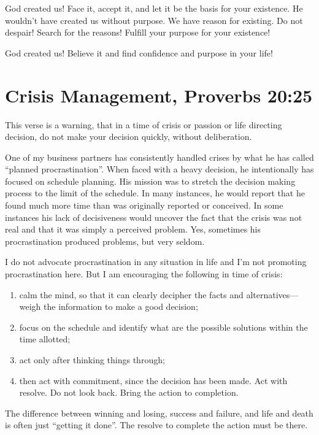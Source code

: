\documentclass[12pt]{memoir}
\begin{document}
God created us! Face it, accept it, and let it be the basis for your
existence. He wouldn't have created us without purpose. We have reason
for existing. Do not despair! Search for the reasons! Fulfill your
purpose for your existence!

God created us! Believe it and find confidence and purpose in your
life!

\section[Crisis Management]{Crisis Management, Proverbs 20:25}

This verse is a warning, that in a time of crisis or passion or life
directing decision, do not make your decision quickly, without deliberation.

One of my business partners has consistently handled crises by what
he has called ``planned procrastination''. When faced with a heavy
decision, he intentionally has focused on schedule planning. His
mission was to stretch the decision making process to the limit of
the schedule. In many instances, he would report that he found much
more time than was originally reported or conceived. In some instances
his lack of decisiveness would uncover the fact that the crisis was
not real and that it was simply a perceived problem. Yes, sometimes
his procrastination produced problems, but very seldom.

I do not advocate procrastination in any situation in
life and I'm not promoting procrastination here. But I am encouraging the following in time of crisis:
 
\begin{enumerate}
\item calm the mind, so that it can clearly decipher the facts and alternatives---weigh
the information to make a good decision; 

\item focus on the schedule and identify what are the possible solutions
within the time allotted;

\item act only after thinking things through;

\item then act with commitment, since the decision has been made. Act with resolve. Do not look back. Bring the action to completion.
\end{enumerate}

The difference between winning and losing, success and failure, and life and death
is often just ``getting it done''. The resolve to complete the action must be there.
\end{document}
